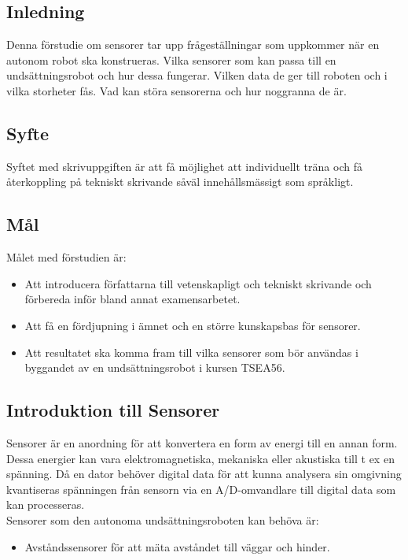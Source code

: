 \documentclass[11pt]{article}
\begin{document}
\pagebreak


\begin{flushleft}


\section{Inledning}
Denna förstudie om sensorer tar upp frågeställningar som uppkommer när en autonom robot ska konstrueras. Vilka sensorer som kan passa till en undsättningsrobot och hur dessa fungerar. Vilken data de ger till roboten och i vilka storheter fås. Vad kan störa sensorerna och hur noggranna de är.

\subsection{Syfte}
Syftet med skrivuppgiften är att få möjlighet att individuellt träna och få återkoppling på tekniskt skrivande såväl innehållsmässigt som språkligt. 

\subsection{Mål}
Målet med förstudien är:
\begin{itemize}

\item Att introducera författarna till vetenskapligt och tekniskt skrivande och förbereda inför bland annat examensarbetet.

\item Att få en fördjupning i ämnet och en större kunskapsbas för sensorer.

\item Att resultatet ska komma fram till vilka sensorer som bör användas i byggandet av en undsättningsrobot i kursen TSEA56.

\end{itemize}
 
 
\subsection{Introduktion till Sensorer}
Sensorer är en anordning för att konvertera en form av energi till en annan form. Dessa energier kan vara elektromagnetiska, mekaniska eller akustiska till t ex en spänning. Då en dator behöver digital data för att kunna analysera sin omgivning kvantiseras spänningen från sensorn via en A/D-omvandlare till digital data som kan processeras. 
\\[0.1in]
Sensorer som den autonoma undsättningsroboten kan behöva är:
\begin{itemize}
\item Avståndssensorer för att mäta avståndet till väggar och hinder.


\end{itemize}
\end{flushleft}
\end{document}
